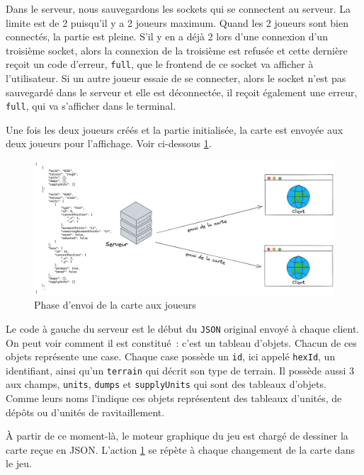Dans le serveur, nous sauvegardons les sockets qui se connectent au serveur. La limite est de 2 puisqu'il y a 2 joueurs maximum. Quand les 2 joueurs sont bien connectés, la partie est pleine. S'il y en a déjà 2 lors d'une connexion d'un troisième socket, alors la connexion de la troisième est refusée et cette dernière reçoit un code d'erreur, {\tt full}, que le frontend de ce socket va afficher à l'utilisateur.
Si un autre joueur essaie de se connecter, alors le socket n'est pas sauvegardé dans le serveur et elle est déconnectée, il reçoit également une erreur, {\tt full}, qui va s'afficher dans le terminal.

Une fois les deux joueurs créés et la partie initialisée, la carte est envoyée aux deux joueurs pour l'affichage. Voir ci-dessous \ref{reseau_carte}.

\begin{figure}[H]
    \centering
    \includegraphics[scale=0.25]{data/reseau_map.png}
    \caption{Phase d'envoi de la carte aux joueurs}
    \label{reseau_carte}
\end{figure}

Le code à gauche du serveur est le début du {\tt JSON} original envoyé à chaque client.
On peut voir comment il est constitué : c'est un tableau d'objets. Chacun de ces objets représente une case.
Chaque case possède un {\tt id}, ici appelé {\tt hexId}, un identifiant, ainsi qu'un {\tt terrain} qui décrit son type de terrain.
Il possède aussi 3 aux champs, {\tt units}, {\tt dumps} et {\tt supplyUnits} qui sont des tableaux d'objets.
Comme leurs noms l'indique ces objets représentent des tableaux d'unités, de dépôts ou d'unités de ravitaillement.

À partir de ce moment-là, le moteur graphique du jeu est chargé de dessiner la carte reçue en JSON.
L'action \ref{reseau_carte} se répète à chaque changement de la carte dans le jeu.


